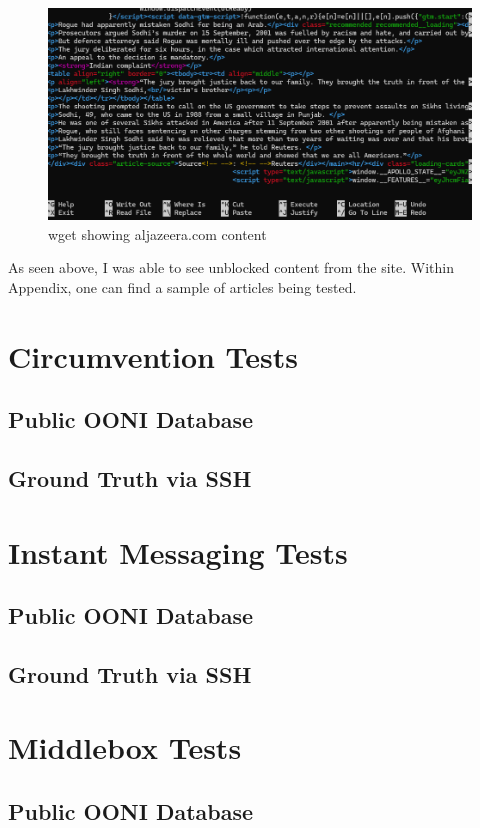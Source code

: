 \begin{figure} [H]
    \centering
    \includegraphics[width=1\linewidth]{wgetAljazeera.png}
    \caption{wget showing aljazeera.com content}
    \label{fig:enter-label}
\end{figure}


As seen above, I was able to see unblocked content from the site. Within Appendix, one can find a sample of articles being tested. 


\section{Circumvention Tests}
\subsection{Public OONI Database}
\subsection{Ground Truth via SSH}

\section{Instant Messaging Tests}
\subsection{Public OONI Database}
\subsection{Ground Truth via SSH}

\section{Middlebox Tests}
\subsection{Public OONI Database}

